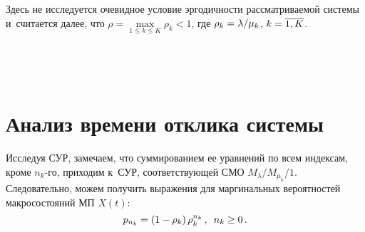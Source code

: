 \begin{multicols}{2}
  Здесь не исследуется очевидное условие эргодичности рассматриваемой 
системы и~считается далее, что $\rho= \max\limits_{1\leq k\leq K} \rho_k<1$, где 
$\rho_k\hm= \lambda/\mu_k$, $k\hm=\overline{1,K}$.

  \begin{figure*}[b] %
         \vspace*{18pt}
\begin{minipage}[t]{79mm}
 \begin{center}
 \mbox{%
 \epsfxsize=73.4mm
 }
 \end{center}
 \vspace*{-6pt}
\end{minipage}
\hfill
            \vspace*{1pt}
            \begin{minipage}[t]{79mm}
 \begin{center}
 \mbox{%
 \epsfxsize=77.9mm
 }
 \end{center}
 \vspace*{-6pt}
\end{minipage}
  \end{figure*}
  
\section{Анализ времени отклика системы}

  Исследуя СУР, замечаем, что суммированием ее уравнений по всем 
индексам, кроме $n_k$-го, приходим к~СУР, соответствующей 
СМО $M_\lambda/M_{\mu_k}/1$. Следовательно, можем 
получить выражения для маргинальных вероятностей макросостояний МП 
$X(t)$: 
  $$
  p_{n_k} =\left( 1-\rho_k\right) \rho_k^{n_k}\,,\enskip n_k\geq 0\,.
  $$
  

\end{multicols}
